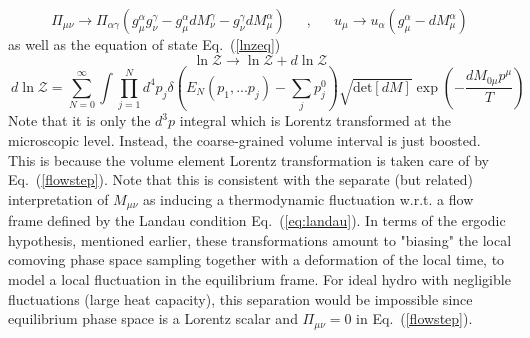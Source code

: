 \documentclass[12pt,onecolumn,showpacs,amssymb,aps,nofootinbib,floatfix]{revtex4-2}
\renewcommand{\eqref}[1]{Eq.~(\ref{#1})}
\newcommand{\eqcomma}{\phantom{AA},\phantom{AA}}
\newcommand{\lnz}{\ln \mathcal{Z}}
\begin{document}
	\begin{equation}
		\label{flowstep}
		\Pi_{\mu \nu} \rightarrow \Pi_{\alpha \gamma} \left( g^\alpha_\mu g^\gamma_\nu- g^\alpha_\mu d M^\gamma_{ \nu} - g^\gamma_\nu d M^\alpha_{ \mu} \right) \eqcomma u_\mu \rightarrow u_\alpha \left( g^\alpha_\mu- dM^\alpha_\mu  \right)
	\end{equation}
	as well as the equation of state \eqref{lnzeq}
	\begin{equation}
		\label{bulktrans}
		\lnz \rightarrow \lnz + d\lnz   
	\end{equation}
	\[\ d\lnz =\sum_{N=0}^\infty \int \prod_{j=1}^N d^4 p_j \delta\left( E_N(p_1,...p_j)-\sum_j p_j^0 \right)  \sqrt{\mathrm{det} \left[dM\right]} \exp \left(- \frac{ dM_{0\mu}p^\mu }{T} \right)  \]
	Note that it is only the $d^3 p$ integral which is Lorentz transformed at the microscopic level. Instead, the coarse-grained volume interval is just boosted. This is because the volume element Lorentz transformation is taken care of by \eqref{flowstep}. Note that this is consistent with the separate (but related) interpretation of $M_{\mu \nu}$ as inducing a thermodynamic fluctuation w.r.t. a flow frame defined by the Landau condition \eqref{eq:landau}.
	In terms of the ergodic hypothesis, mentioned earlier, these transformations amount to "biasing" the local comoving phase space sampling together with a deformation of the local time, to model a local fluctuation in the equilibrium frame.
	For ideal hydro with negligible fluctuations (large heat capacity), this separation would be impossible since equilibrium phase space is a Lorentz scalar and $\Pi_{\mu \nu}=0$ in \eqref{flowstep}.
	
\end{document}
